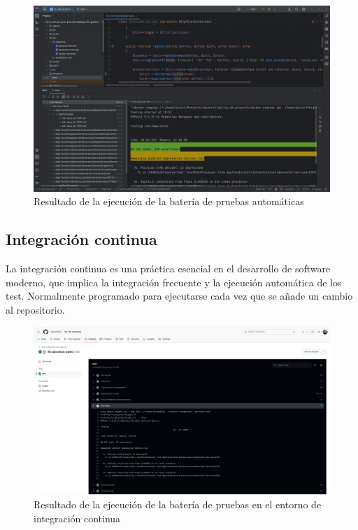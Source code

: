 \begin{figure}[ht]
    \begin{center}
        \includegraphics[width=\textwidth]{./chapter/4/images/chapter_4.5.test_suite_execution}
        \caption{Resultado de la ejecución de la batería de pruebas automáticas}
        \label{fig:chapter_4.5.test_suite_execution}
    \end{center}
\end{figure}

\subsection{Integración continua}
La integración continua es una práctica esencial en el desarrollo de software moderno, que implica la integración
frecuente y la ejecución automática de los test.
Normalmente programado para ejecutarse cada vez que se añade un cambio al repositorio.

\begin{figure}[ht]
    \begin{center}
        \includegraphics[width=\textwidth]{./chapter/4/images/chapter_4.5.github_actions_execution}
        \caption{Resultado de la ejecución de la batería de pruebas en el entorno de integración continua}
        \label{fig:chapter_4.5.github_actions_execution}
    \end{center}
\end{figure}

